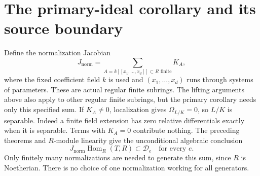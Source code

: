 \documentclass[11pt]{article}
\newcommand{\Hom}{\operatorname{Hom}}
\begin{document}
\section{The primary-ideal corollary and its source boundary}
Define the normalization Jacobian
\[
 J_{\mathrm{norm}}=\sum_{A=k[[x_1,\ldots,x_d]]\subset R\text{ finite}} K_A,
\]
where the fixed coefficient field $k$ is used and $(x_1,\ldots,x_d)$
runs through systems of parameters. These are actual regular finite
subrings. The lifting arguments above also apply to other regular finite
subrings, but the primary corollary needs only this specified sum.
If $K_A\ne0$, localization gives $\Omega_{L/K}=0$, so $L/K$ is
separable. Indeed a finite field extension has zero relative differentials
exactly when it is separable. Terms with $K_A=0$ contribute nothing.
The preceding theorems and $R$-module linearity give the unconditional
algebraic conclusion
\[
 J_{\mathrm{norm}}\Hom_R(T,R)\subset\mathcal D_e
 \quad\text{for every }e.
\]
Only finitely many normalizations are needed to generate this sum, since
$R$ is Noetherian. There is no choice of one normalization working for all
generators.
\end{document}
